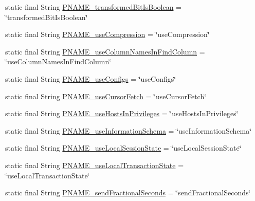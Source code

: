 \begin{DoxyCompactItemize}
\item 
static final String \mbox{\hyperlink{classcom_1_1mysql_1_1cj_1_1conf_1_1_property_definitions_a681199db5114db7c2d469077e04c9ff3}{P\+N\+A\+M\+E\+\_\+transformed\+Bit\+Is\+Boolean}} = \char`\"{}transformed\+Bit\+Is\+Boolean\char`\"{}
\item 
static final String \mbox{\hyperlink{classcom_1_1mysql_1_1cj_1_1conf_1_1_property_definitions_aea3b1d57eb56e4695337ee23ef78194e}{P\+N\+A\+M\+E\+\_\+use\+Compression}} = \char`\"{}use\+Compression\char`\"{}
\item 
static final String \mbox{\hyperlink{classcom_1_1mysql_1_1cj_1_1conf_1_1_property_definitions_aa16ecd4826beb42f7671eae9c6fdff7c}{P\+N\+A\+M\+E\+\_\+use\+Column\+Names\+In\+Find\+Column}} = \char`\"{}use\+Column\+Names\+In\+Find\+Column\char`\"{}
\item 
static final String \mbox{\hyperlink{classcom_1_1mysql_1_1cj_1_1conf_1_1_property_definitions_ad57da9f284d14d83823c3886c2489868}{P\+N\+A\+M\+E\+\_\+use\+Configs}} = \char`\"{}use\+Configs\char`\"{}
\item 
static final String \mbox{\hyperlink{classcom_1_1mysql_1_1cj_1_1conf_1_1_property_definitions_a6608085ab3938e4a1a2235d2b5b9f0dd}{P\+N\+A\+M\+E\+\_\+use\+Cursor\+Fetch}} = \char`\"{}use\+Cursor\+Fetch\char`\"{}
\item 
static final String \mbox{\hyperlink{classcom_1_1mysql_1_1cj_1_1conf_1_1_property_definitions_a86edc2386f293d98746bade8cf7a8654}{P\+N\+A\+M\+E\+\_\+use\+Hosts\+In\+Privileges}} = \char`\"{}use\+Hosts\+In\+Privileges\char`\"{}
\item 
static final String \mbox{\hyperlink{classcom_1_1mysql_1_1cj_1_1conf_1_1_property_definitions_a2109d5b70f3ebceaca4766b3ddc1139d}{P\+N\+A\+M\+E\+\_\+use\+Information\+Schema}} = \char`\"{}use\+Information\+Schema\char`\"{}
\item 
static final String \mbox{\hyperlink{classcom_1_1mysql_1_1cj_1_1conf_1_1_property_definitions_a4d27174744b75abfcc0f063f5e0efcb5}{P\+N\+A\+M\+E\+\_\+use\+Local\+Session\+State}} = \char`\"{}use\+Local\+Session\+State\char`\"{}
\item 
static final String \mbox{\hyperlink{classcom_1_1mysql_1_1cj_1_1conf_1_1_property_definitions_a9a20aaf659de41f9f8ddb7c563d36b88}{P\+N\+A\+M\+E\+\_\+use\+Local\+Transaction\+State}} = \char`\"{}use\+Local\+Transaction\+State\char`\"{}
\item 
static final String \mbox{\hyperlink{classcom_1_1mysql_1_1cj_1_1conf_1_1_property_definitions_a1ba34fe2bbbe261ccad681394fda2a2d}{P\+N\+A\+M\+E\+\_\+send\+Fractional\+Seconds}} = \char`\"{}send\+Fractional\+Seconds\char`\"{}

\end{DoxyCompactItemize}
